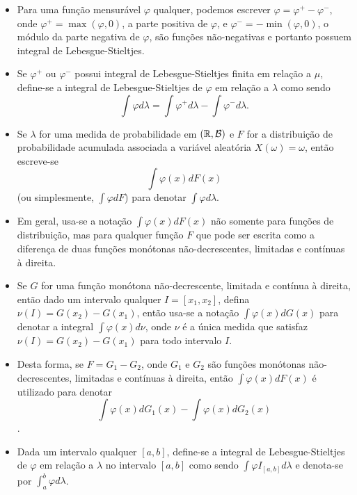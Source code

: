 \begin{frame}
\vspace{1cm}
\begin{block}{}
\begin{itemize}
\item Para uma função mensurável $\varphi$ qualquer, podemos escrever $\varphi=\varphi^+-\varphi^-$, onde $\varphi^+=\max(\varphi,0)$, a parte positiva de $\varphi$, e $\varphi^-=-\min(\varphi,0)$, o módulo da parte negativa de $\varphi$, são funções não-negativas e portanto possuem integral de Lebesgue-Stieltjes. 

\item Se $\varphi^+$ ou $\varphi^-$ possui integral de Lebesgue-Stieltjes finita em relação a $\mu$, define-se a integral de Lebesgue-Stieltjes de $\varphi$ em relação a $\lambda$ como sendo
$$\int\varphi d\lambda=\int\varphi^+d\lambda-\int\varphi^-d\lambda.$$

\item Se $\lambda$ for uma medida de probabilidade em $(\mathbb{R},{\cal B})$ e $F$ for a distribuição de probabilidade acumulada associada a variável aleatória $X(\omega)=\omega$, então escreve-se $$\int \varphi(x) dF(x)$$ (ou simplesmente, $\int \varphi dF$) para denotar $\int \varphi d\lambda$.
%
\end{itemize}
\end{block}
\end{frame}
%
\begin{frame}
\vspace{1cm}
\begin{block}{}
\begin{itemize}%
%
\item Em geral, usa-se a notação $\int \varphi(x) dF(x)$ não somente para funções de distribuição, mas para qualquer função $F$ que pode ser escrita como a diferença de duas funções monótonas não-decrescentes, limitadas e contínuas à direita. 

\item Se $G$ for uma função monótona não-decrescente, limitada e contínua à direita, então dado um intervalo qualquer $I=[x_1,x_2]$, defina $\nu(I)=G(x_2)-G(x_1)$, então usa-se a notação $\int \varphi(x) dG(x)$ para denotar a integral $\int \varphi(x) d\nu$, onde $\nu$ é a única medida que satisfaz $\nu(I)=G(x_2)-G(x_1)$ para todo intervalo $I$. 

\item Desta forma, se $F=G_1-G_2$, onde $G_1$ e $G_2$ são funções monótonas não-decrescentes, limitadas e contínuas à direita, então $\int \varphi(x) dF(x)$ é utilizado para denotar $$\int \varphi(x) dG_1(x)-\int \varphi(x) dG_2(x)$$.

\item Dada um intervalo qualquer $[a,b]$, define-se a integral de Lebesgue-Stieltjes de $\varphi$ em relação a $\lambda$ no intervalo $[a,b]$ como sendo $\int \varphi I_{[a,b]}d\lambda$ e denota-se por $\int_{a}^{b}\varphi d\lambda$.
\end{itemize}
\end{block}
\end{frame}
